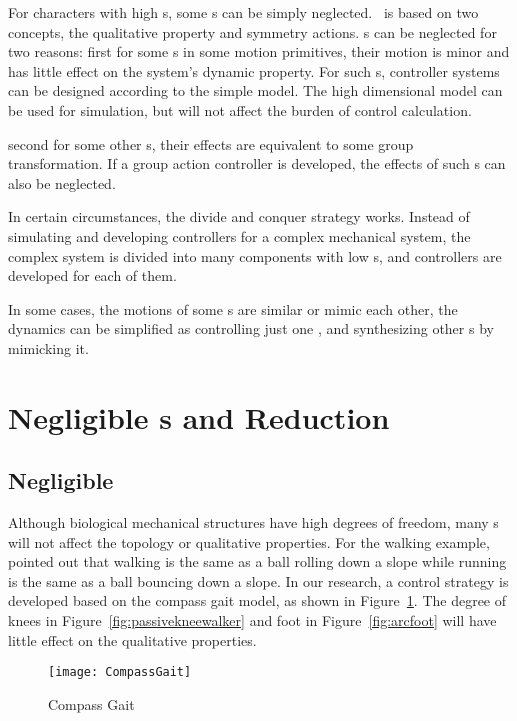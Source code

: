 \begin{itemize}
For characters with high {\dof}s, some {\dof}s can be simply neglected.
\moit\ is based on two concepts, the qualitative property and symmetry actions.
\dof s can be neglected for two reasons:
first for some {\dof}s in some motion primitives, their motion is minor and has little effect on the system's dynamic property.
For such {\dof}s, controller systems can be designed according to the simple model. 
The high dimensional model can be used for simulation, but will not affect the burden of control calculation.

second for some other {\dof}s, their effects are equivalent to some group transformation.
If a group action controller is developed, the effects of such {\dof}s can also be neglected.

In certain circumstances, the divide and conquer strategy works.
Instead of simulating and developing controllers for a complex mechanical system, the complex system is divided into many  components with low {\dof}s, and controllers are developed for each of them.

In some cases, the motions of some {\dof}s are similar or mimic each other, the dynamics can be simplified as controlling just one {\dof}, and synthesizing other {\dof}s by mimicking it.
\end{itemize} 

\section{Negligible {\dof}s and Reduction}
\subsection{Negligible \dof}
Although biological mechanical structures have high degrees of freedom, many {\dof}s will not affect the topology or qualitative properties.
For the walking example, \citet{Raibert1986} pointed out that walking is the same as a ball rolling down a slope while running is the same as a ball bouncing down a slope.
In our research, a control strategy is developed based on the compass gait model, as shown in Figure~\ref{fig:compassgait}.
The degree of knees in Figure~\ref{fig:passivekneewalker} and foot in Figure~\ref{fig:arcfoot} will have little effect on the qualitative properties.
\begin{figure}[!htbp]
  \begin{center}
      \texttt{[image: CompassGait]}
    \caption{Compass Gait}
    \label{fig:compassgait}
\end{center}
\end{figure}



